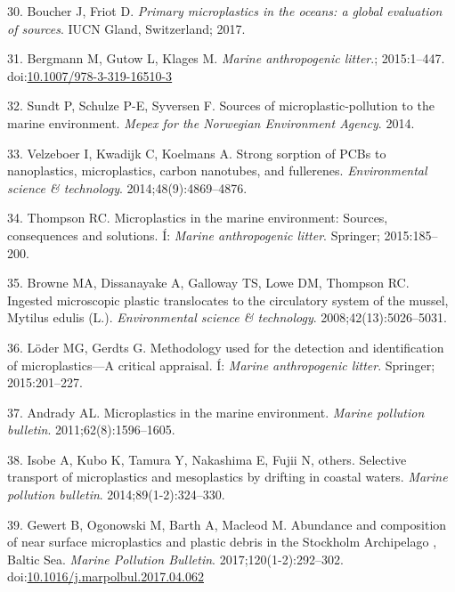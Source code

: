 \documentclass[icelandic,]{book}
\begin{document}
\leavevmode\hypertarget{ref-boucher2017primary}{}%
30. Boucher J, Friot D. \emph{Primary microplastics in the oceans: a global evaluation of sources}. IUCN Gland, Switzerland; 2017.

\leavevmode\hypertarget{ref-Bergmann2015}{}%
31. Bergmann M, Gutow L, Klages M. \emph{Marine anthropogenic litter}.; 2015:1--447. doi:\href{https://doi.org/10.1007/978-3-319-16510-3}{10.1007/978-3-319-16510-3}

\leavevmode\hypertarget{ref-sundt2014sources}{}%
32. Sundt P, Schulze P-E, Syversen F. Sources of microplastic-pollution to the marine environment. \emph{Mepex for the Norwegian Environment Agency}. 2014.

\leavevmode\hypertarget{ref-velzeboer2014strong}{}%
33. Velzeboer I, Kwadijk C, Koelmans A. Strong sorption of PCBs to nanoplastics, microplastics, carbon nanotubes, and fullerenes. \emph{Environmental science \& technology}. 2014;48(9):4869--4876.

\leavevmode\hypertarget{ref-thompson2015microplastics}{}%
34. Thompson RC. Microplastics in the marine environment: Sources, consequences and solutions. Í: \emph{Marine anthropogenic litter}. Springer; 2015:185--200.

\leavevmode\hypertarget{ref-browne2008ingested}{}%
35. Browne MA, Dissanayake A, Galloway TS, Lowe DM, Thompson RC. Ingested microscopic plastic translocates to the circulatory system of the mussel, Mytilus edulis (L.). \emph{Environmental science \& technology}. 2008;42(13):5026--5031.

\leavevmode\hypertarget{ref-loder2015methodology}{}%
36. Löder MG, Gerdts G. Methodology used for the detection and identification of microplastics---A critical appraisal. Í: \emph{Marine anthropogenic litter}. Springer; 2015:201--227.

\leavevmode\hypertarget{ref-andrady2011microplastics}{}%
37. Andrady AL. Microplastics in the marine environment. \emph{Marine pollution bulletin}. 2011;62(8):1596--1605.

\leavevmode\hypertarget{ref-isobe2014selective}{}%
38. Isobe A, Kubo K, Tamura Y, Nakashima E, Fujii N, others. Selective transport of microplastics and mesoplastics by drifting in coastal waters. \emph{Marine pollution bulletin}. 2014;89(1-2):324--330.

\leavevmode\hypertarget{ref-Gewert2017}{}%
39. Gewert B, Ogonowski M, Barth A, Macleod M. Abundance and composition of near surface microplastics and plastic debris in the Stockholm Archipelago , Baltic Sea. \emph{Marine Pollution Bulletin}. 2017;120(1-2):292--302. doi:\href{https://doi.org/10.1016/j.marpolbul.2017.04.062}{10.1016/j.marpolbul.2017.04.062}
\end{document}
